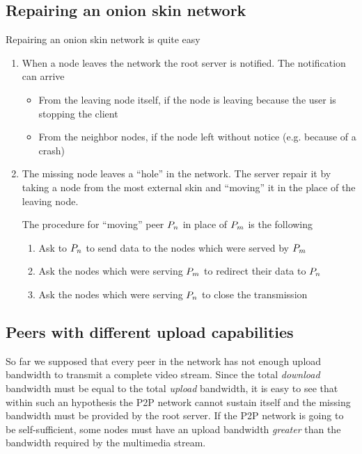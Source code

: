 \documentclass{medusabook}
\begin{document}
\subsection{Repairing an onion skin network}
\label{sect:0.2;medusa_book}

Repairing an onion skin network is quite easy

\begin{enumerate}
\item
When a node leaves the network the root server is notified.  The
notification can arrive
\begin{itemize}
  \item
    From the leaving node itself, if the node is leaving because the
    user is stopping the client
  \item
    From the neighbor nodes, if the node left without notice
    (e.g. because of a crash)
\end{itemize}
\item
The missing node leaves a ``hole'' in the network.  The server repair
it by taking a node from the most external skin and ``moving'' it in
the place of the leaving node.  

The procedure for ``moving'' peer $P_{n}$ in place of $P_{m}$ is
the following

\begin{enumerate}
  \item
    Ask to  $P_{n}$  to send data to the nodes which were
    served by $P_{m}$
  \item
    Ask the nodes which were serving $P_{m}$ to redirect their
    data to $P_{n}$
  \item
    Ask the nodes which were serving $P_{n}$ to close
    the transmission
\end{enumerate}
\end{enumerate}
%

\subsection{Peers with different upload capabilities}
\label{sub:1.1.0;medusa_book}

So far we supposed that every peer in the network has not enough
upload bandwidth to transmit a complete video stream.  Since the total
\emph{download} bandwidth must be equal to the total \emph{upload}
bandwidth, it is easy to see that within such an hypothesis the P2P
network cannot sustain itself and the missing bandwidth must be
provided by the root server.  If the P2P network is going to be
self-sufficient, some nodes must have an upload bandwidth
\emph{greater} than the bandwidth required by the multimedia stream.
\end{document}
